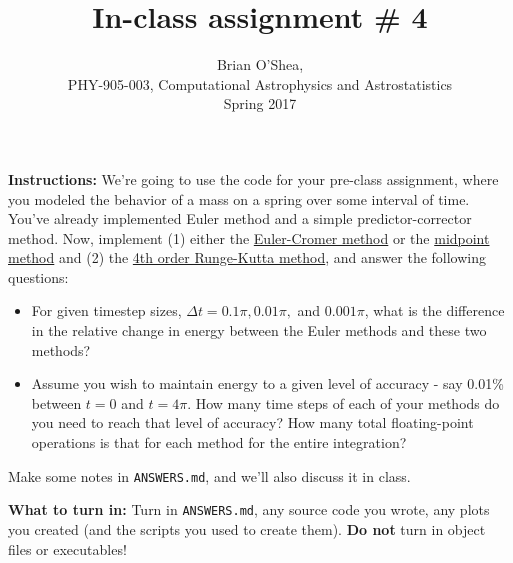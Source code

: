 \documentclass[10pt]{article}
\title{In-class assignment \# 4}
\author{Brian O'Shea, \\PHY-905-003, Computational Astrophysics and
  Astrostatistics\\Spring 2017}
\date{} %
\begin{document}
 
\maketitle

\vspace{-5mm}

\noindent \textbf{Instructions:}   We're going to use the code for
your pre-class assignment, where you modeled the behavior of a mass on
a spring over some interval of time.  You've already implemented Euler
method and a simple predictor-corrector method.  Now, implement (1)
either the
  \href{https://en.wikipedia.org/wiki/Semi-implicit_Euler_method}{Euler-Cromer
  method}  or the 
  \href{https://en.wikipedia.org/wiki/Midpoint_method}{midpoint
    method} and (2) the
  \href{https://en.wikipedia.org/wiki/Runge%E2%80%93Kutta_methods}{4th
                                order Runge-Kutta method}, and answer
                              the following questions:

\begin{itemize}

\item For given timestep sizes, $\Delta t = 0.1 \pi, 0.01 \pi,$ and
  $0.001 \pi$, what is the
  difference in the relative change in energy between the Euler
  methods and these two methods?

\item Assume you wish to maintain energy to a given level of accuracy
  - say 0.01\% between $t=0$ and $t=4\pi$.  How many time steps of
  each of your methods do you need to reach that level of accuracy?
  How many total floating-point operations is that for each method for
  the entire integration?

\end{itemize}

\noindent
Make some notes in \texttt{ANSWERS.md}, and
we'll also discuss it in class.

\vspace{5mm}

\noindent 
\textbf{What to turn in:} Turn in \texttt{ANSWERS.md}, any
source code you wrote, any plots you created (and the scripts you used
to create them).  \textbf{Do not} turn in object files or
executables!
\end{document}
